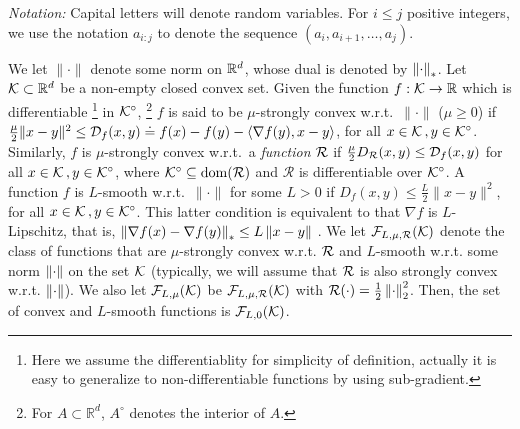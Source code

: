 
\textit{Notation:} Capital letters will denote random variables.
For $i\le j$ positive integers,
 we use the notation $a_{i:j}$ to denote
 the sequence $(a_i,a_{i+1}, \dots, a_{j})$.

 We let $\| \cdot \|$ denote some norm on $\mathbb{R}^d$, whose dual is denoted by $\left\|\cdot\right\|_*$. 
 Let $\mathcal{K} \subset \mathbb{R}^d$ be a non-empty closed convex  set. 
 Given the function $f:\mathcal{K} \to \mathbb{R}$ which is differentiable%
\footnote{Here we assume the differentiablity for simplicity of definition, actually it is easy to generalize to non-differentiable functions by using sub-gradient.} 
  in $\mathcal{K}^\circ$,%
  \footnote{For $A\subset \mathbb{R}^d$, $A^\circ$ denotes the interior of $A$.}
 $f$ is said to be $\mu$-strongly convex w.r.t.\  $\| \cdot \|$  ($\mu\ge 0$) if
 $\tfrac{\mu}{2} \|x-y\|^2 \le \mathcal{D}_f(x,y)\doteq f(x)-f(y)-\langle \nabla f(y),x-y \rangle$, for all $x \in \mathcal{K} \,, y \in \mathcal{K}^\circ$.
Similarly, $f$ is $\mu$-strongly convex w.r.t.\  a \emph{function} $\mathcal{R}$
	if $\tfrac{\mu}{2}D_{\mathcal{R}}(x,y)\le\mathcal{D}_f(x,y)$ for all $x \in \mathcal{K} \,, y \in \mathcal{K}^\circ$, where $\mathcal{K}^\circ\subseteq \operatorname{dom}(\mathcal{R})$ and $\mathcal{R}$ is differentiable over $\mathcal{K}^\circ$.
 A function $f$ is $L$-smooth w.r.t.\  $\| \cdot \| $ for some $L>0$ if
$D_f(x,y) \le \tfrac{L}{2} \|x-y\|^2$, for all $x \in \mathcal{K} \,, y \in \mathcal{K}^\circ$.
 This latter condition is equivalent to that $\nabla f$ is $L$-Lipschitz, that is, 
 $\left\|\nabla f(x) - \nabla f(y)\right\|_* \le L \left\|x-y\right\|$ \citep[Theorem~2.1.5]{nesterov2004introductory}.
 We let $\mathcal{F}_{L,\mu, \mathcal{R}}(\mathcal{K})$ denote the class of functions that are $\mu$-strongly convex w.r.t. $\mathcal{R}$ and $L$-smooth w.r.t. some norm $\left\|\cdot\right\|$ on the set $\mathcal{K}$ (typically, we will assume that $\mathcal{R}$ is also strongly convex w.r.t. $\left\|\cdot\right\|$).
We also let $\mathcal{F}_{L,\mu}(\mathcal{K})$ be $\mathcal{F}_{L,\mu,\mathcal{R}}(\mathcal{K})$ with $\mathcal{R}(\cdot) = \frac12 \left\|\cdot\right\|_2^2$.
Then, the set of convex and $L$-smooth functions is  $\mathcal{F}_{L,0}(\mathcal{K})$.

